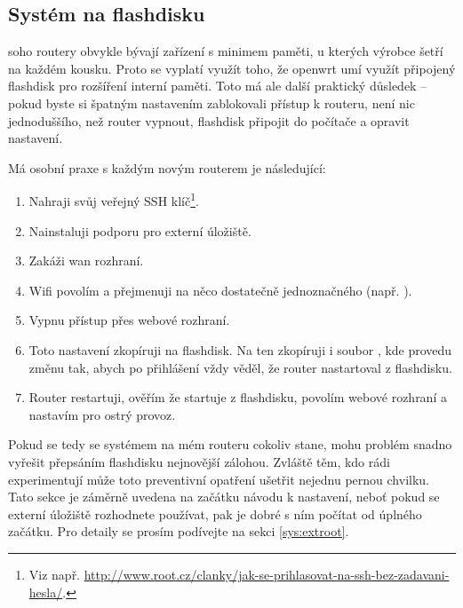 \subsection{Systém na flashdisku}
\gls{soho} routery obvykle bývají zařízení s minimem paměti, u kterých výrobce
šetří na každém kousku. Proto se vyplatí využít toho, že \gls{openwrt} umí
využít připojený flashdisk pro rozšíření interní paměti. Toto má ale další
praktický důsledek -- pokud byste si špatným nastavením zablokovali přístup
k routeru, není nic
jednoduššího, než router vypnout, flashdisk připojit do počítače a opravit
nastavení.

Má osobní praxe s každým novým routerem je následující:
\begin{enumerate}
\item Nahraji svůj veřejný
SSH klíč\footnote{Viz např. \url{http://www.root.cz/clanky/jak-se-prihlasovat-na-ssh-bez-zadavani-hesla/}.}.
\item Nainstaluji podporu pro externí úložiště.
\item Zakáži \gls{wan} rozhraní.
\item Wifi povolím a přejmenuji na něco dostatečně jednoznačného (např. ).
\item Vypnu přístup přes webové rozhraní.
\item Toto nastavení zkopíruji na flashdisk. Na ten zkopíruji i soubor
, kde provedu změnu tak, abych po přihlášení vždy věděl, že
router nastartoval z flashdisku.
\item Router restartuji, ověřím že startuje z flashdisku, povolím webové
rozhraní a nastavím pro ostrý provoz.
\end{enumerate}

Pokud se tedy se systémem na mém routeru cokoliv stane, mohu problém snadno
vyřešit přepsáním flashdisku nejnovější zálohou. Zvláště těm, kdo rádi experimentují
může toto preventivní opatření ušetřit nejednu pernou chvilku.
Tato sekce je záměrně uvedena na začátku návodu k nastavení, neboť pokud
se externí úložiště rozhodnete používat, pak je dobré s ním počítat od úplného
začátku.
Pro detaily
se prosím podívejte na sekci \ref{sys:extroot}.
